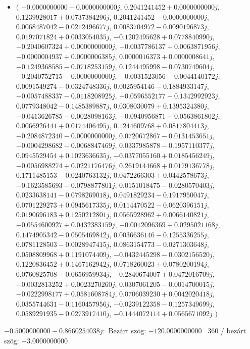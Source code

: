\documentclass[14pt,a4paper]{article}
\begin{document}
\begin{itemize}
\item
$\big($
$-0.0000000000-0.0000000000j$, $0.2041241452+0.0000000000j$, $0.1239928017+0.0737384296j$, $0.2041241452-0.0000000000j$, $0.0068487042-0.0212496677j$, $0.0083704972-0.0090196873j$, $0.0197071824+0.0033054035j$, $-0.1202495628+0.0778840990j$, $-0.2040607324+0.0000000000j$, $-0.0037786137+0.0063871956j$, $-0.0000004937+0.0000006385j$, $0.0000016373+0.0000008641j$, $-0.1249368585-0.0718253159j$, $0.1244495998-0.0730749604j$, $-0.2040752715-0.0000000000j$, $-0.0031523056-0.0044140172j$, $0.0091549274-0.0324748336j$, $0.0025954146-0.1884933147j$, $-0.0057488337-0.0118208925j$, $-0.0596552177-0.1342992923j$, $0.0779348042-0.1485389887j$, $0.0308030079+0.1395324380j$, $-0.0413626785-0.0028098163j$, $-0.0940956871+0.0563861802j$, $0.0066926441+0.0174406495j$, $0.1244609768+0.0817804413j$, $-0.2084872340-0.0000000000j$, $0.0720672867-0.0131453651j$, $-0.0004298682-0.0068847469j$, $0.0337985878-0.1957110377j$, $0.0945529454+0.1023636635j$, $-0.0377055160+0.0185456249j$, $-0.0056988274+0.0221176476j$, $0.2619144668+0.0179136778j$, $0.1711485153-0.0240763132j$, $0.0472266303+0.0442578673j$, $-0.1623585693-0.0798877801j$, $0.0151018475-0.0280570403j$, $0.0233638141-0.0798269018j$, $0.0491829234-0.1917950047j$, $0.0701229273+0.0945617335j$, $0.0114470522-0.0620396151j$, $0.0190696183+0.1250212801j$, $0.0565928962+0.0066140821j$, $-0.0554600927+0.0432383159j$, $-0.0012096369+0.0295021168j$, $0.1474905342-0.0505469842j$, $0.0036636146-0.1255336255j$, $0.0781128503-0.0028947415j$, $0.0863154773-0.0271303648j$, $0.0508809968+0.1191074409j$, $-0.0432445298-0.0302156520j$, $0.1220836452+0.1467162942j$, $0.0718260023+0.0780200194j$, $0.0760825708-0.0656959934j$, $-0.2840674007+0.0472016709j$, $-0.0032813252+0.0023270260j$, $0.0307061205-0.0014700015j$, $-0.0222998177+0.0581608784j$, $0.0706039230+0.0042020418j$, $0.0355744631-0.1160457956j$, $-0.0239122358-0.1257349699j$, $0.0589291935-0.0273917410j$, $-0.1444072114+0.0565671092j$
$\big)$
\end{itemize}
$-0.5000000000-0.8660254038j$:\
Bezárt szög: $-120.0000000000$ \
360 / bezárt szög: $-3.0000000000$\
\end{document}
